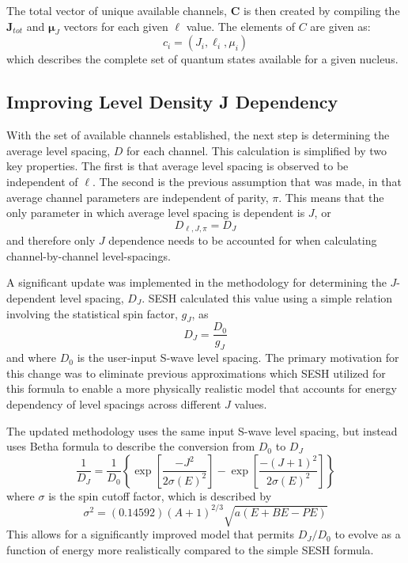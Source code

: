         The total vector of unique available channels, $\mathbf{C}$ is then created by compiling the $\mathbf{J}_{tot}$ and $\mathbf{\mu}_J$ vectors for each given $\ell$ value. The elements of $C$ are given as:
        \begin{equation}
        \label{eq:channel=list}
            c_i = (J_i, \ell_i, \mu_i)
        \end{equation}
        which describes the complete set of quantum states available for a given nucleus.

    \subsection{Improving Level Density J Dependency}
        \label{ssec:level-density}
        With the set of available channels established, the next step is determining the average level spacing, $D$ for each channel. This calculation is simplified by two key properties. The first is that average level spacing is observed to be independent of $\ell$\cite{level-spacing-statistics}. The second is the previous assumption that was made, in that average channel parameters are independent of parity, $\pi$. This means that the only parameter in which average level spacing is dependent is $J$, or
        \begin{equation}
            D_{\ell,J,\pi} = D_J
        \end{equation}
        and therefore only $J$ dependence needs to be accounted for when calculating channel-by-channel level-spacings.
        
        A significant update was implemented in the methodology for determining the $J$-dependent level spacing, $D_J$. SESH calculated this value  using a simple relation involving the statistical spin factor, $g_J$, as
        \begin{equation}
            \label{eq:simple-j-dependency}
            D_J = \frac{D_0}{g_J}
        \end{equation}
        and where $D_0$ is the user-input S-wave level spacing. The primary motivation for this change was to eliminate previous approximations which SESH utilized for this formula to enable a more physically realistic model that accounts for energy dependency of level spacings across different $J$ values.
        
        The updated methodology uses the same input S-wave level spacing, but instead uses Betha formula to describe the conversion from $D_0$ to $D_J$
        \begin{equation}
            \label{eq:bethe-formula}
            \frac{1}{D_J} = \frac{1}{D_0}
            \left\{ \exp{ \left[ \frac{-J^2}{2\sigma(E)^2}\right]} - \exp{ \left[ \frac{-(J+1)^2}{2\sigma(E)^2}\right]} \right\} 
        \end{equation}
        where $\sigma$ is the spin cutoff factor, which is described by
        \begin{equation}
            \sigma^2 = (0.14592)(A+1)^{2/3}\sqrt{a(E + BE - PE)}
        \end{equation}
        This allows for a significantly improved model that permits $D_J/D_0$ to evolve as a function of energy more realistically compared to the simple SESH formula.
        
